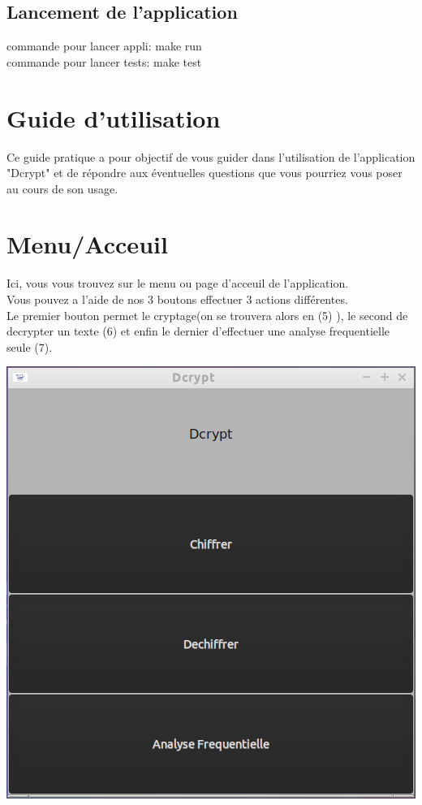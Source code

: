 \documentclass[a4]{article}
\begin{document}
		\subsection{Lancement de l'application}
			commande pour lancer appli: make run \\
			commande pour lancer tests: make test\\


	\section{Guide d'utilisation}
	
	
	Ce guide pratique a pour objectif de vous guider dans l’utilisation de l’application
"Dcrypt" et de répondre aux éventuelles questions que vous pourriez vous poser au
cours de son usage. 
	
	
	\newpage
	\section{Menu/Acceuil}
			Ici, vous vous trouvez sur le menu ou page d'acceuil de l'application. \\
			Vous pouvez a l'aide de nos 3 boutons effectuer 3 actions différentes.\\
 			Le premier bouton permet le cryptage(on se trouvera alors en (5) ), le second de 
 			decrypter un texte (6) et enfin le dernier d'effectuer une analyse frequentielle seule (7).
			\begin{center}\includegraphics[scale=0.4]{1.png}\end{center}
			
\end{document}
